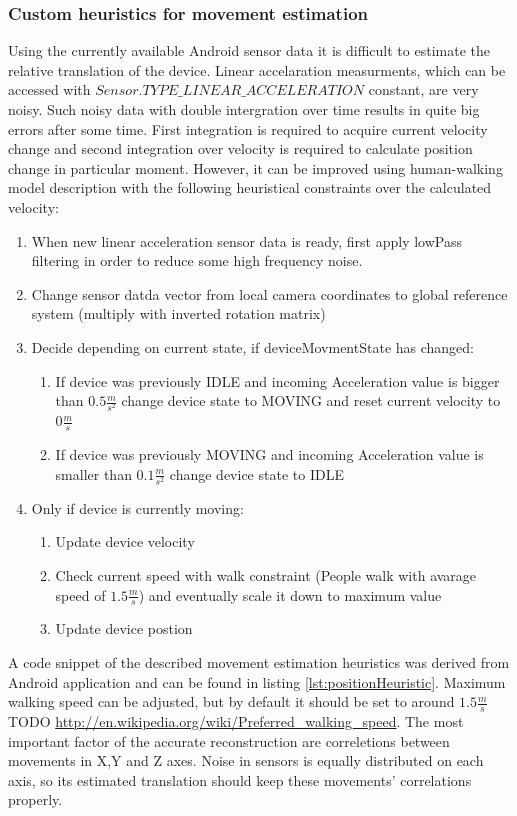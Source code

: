 \subsubsection{Custom heuristics for movement estimation}
Using the currently available Android sensor data it is difficult to estimate the relative translation of the device. Linear accelaration measurments, which can be accessed with $Sensor.TYPE\_LINEAR\_ACCELERATION$ constant, are very noisy. Such noisy data with double intergration over time results in quite big errors after some time. First integration is required to acquire current velocity change and second integration over velocity is required to calculate position change in particular moment.
However, it can be improved using human-walking model description with the following heuristical constraints over the calculated velocity:
\begin{enumerate}
\item When new linear acceleration sensor data is ready, first apply lowPass filtering in order to reduce some high frequency noise.
\item Change sensor datda vector from local camera coordinates to global reference system (multiply with inverted rotation matrix)
\item Decide depending on current state, if deviceMovmentState has changed:
\begin{enumerate}
\item If device was previously IDLE and incoming Acceleration value is bigger than $0.5\frac{m}{s^2}$ change device state to MOVING and reset current velocity to $0\frac{m}{s}$
\item If device was previously MOVING and incoming Acceleration value is smaller than $0.1\frac{m}{s^2}$ change device state to IDLE
\end{enumerate}
\item Only if device is currently moving:
\begin{enumerate}
\item Update device velocity
\item Check current speed with walk constraint (People walk with avarage speed of $1.5\frac{m}{s}$) and eventually scale it down to maximum value
\item Update device postion
\end{enumerate}
\end{enumerate}
A code snippet of the described movement estimation heuristics was derived from Android application and can be found in  listing \ref{lst:positionHeuristic}. Maximum walking speed can be adjusted, but by default it should be set to around $1.5\frac{m}{s}$ TODO \url{http://en.wikipedia.org/wiki/Preferred_walking_speed}. 
The most important factor of the accurate reconstruction are correletions between movements in X,Y and Z axes. Noise in sensors is equally distributed on each axis, so its estimated translation should keep these movements' correlations properly.

